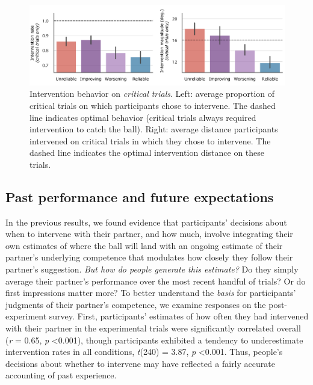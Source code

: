 \documentclass[10pt,letterpaper]{article}
\begin{document}
\begin{figure}[H]
\begin{center}
\includegraphics[width=\linewidth]{img/critical_trial_intervention_summary.pdf}
\end{center}
\caption{Intervention behavior on \textit{critical trials}. Left: average proportion of critical trials on which participants chose to intervene. The dashed line indicates optimal behavior (critical trials always required intervention to catch the ball). Right: average distance participants intervened on critical trials in which they chose to intervene. The dashed line indicates the optimal intervention distance on these trials.} 
\label{fig:critical_trials}
\end{figure}


\subsection{Past performance and future expectations}

In the previous results, we found evidence that participants' decisions about when to intervene with their partner, and how much, involve integrating their own estimates of where the ball will land with an ongoing estimate of their partner's underlying competence that modulates how closely they follow their partner's suggestion. \textit{But how do people generate this estimate?} Do they simply average their partner's performance over the most recent handful of trials? Or do first impressions matter more? To better understand the \textit{basis} for participants' judgments of their partner's competence, we examine responses on the post-experiment survey. First, participants' estimates of how often they had intervened with their partner in the experimental trials were significantly correlated overall (\textit{r} = 0.65, \textit{p} \textless{0.001}), though participants exhibited a tendency to underestimate intervention rates in all conditions, \textit{t}(240) = 3.87, \textit{p} \textless{0.001}. Thus, people's decisions about whether to intervene may have reflected a fairly accurate accounting of past experience. 
\end{document}
